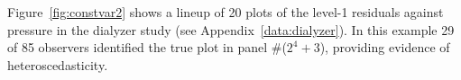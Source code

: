 \documentclass[12pt]{article} %
\newcommand{\hh}[1]{{\color{orange} #1}}
\newcommand{\al}[1]{{\color{ForestGreen} #1}}
\newcommand{\alnote}[1]{\todo[inline,color=green!40]{#1}} %
\newcommand{\hhnote}[1]{\todo[inline,color=orange!40]{#1}}
\begin{document}
Figure~\ref{fig:constvar2} shows a lineup of 20 plots of the level-1 residuals against pressure in the dialyzer study (see Appendix~\ref{data:dialyzer}).
 In this example 29 of 85 observers identified the true plot in panel \#($2^4 +3$), providing evidence of heteroscedasticity. 







\end{document}
